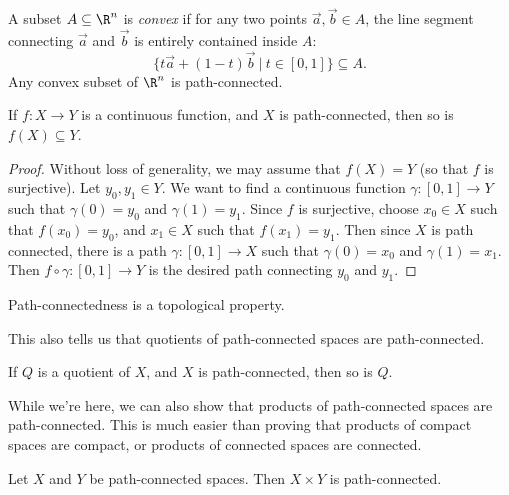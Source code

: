 \documentclass[noname]{notes}
\begin{document}
\begin{example}
\label{convex subsets are path connected}
	A subset $A \subseteq \R^n$ is \emph{convex} if for any two points $\vec a, \vec b \in A$, the line segment connecting $\vec a$ and $\vec b$ is entirely contained inside $A$:
	\[
		\Big\{ t \vec a + (1-t) \vec b \ \Big\vert\ t \in [0,1] \Big\} \subseteq A. 
	\]
	Any convex subset of $\R^n$ is path-connected. 
\end{example}

\begin{proposition}
	If $f \colon X \to Y$ is a continuous function, and $X$ is path-connected, then so is $f(X) \subseteq Y$. 
\end{proposition}

\begin{proof}
	Without loss of generality, we may assume that $f(X) = Y$ (so that $f$ is surjective). Let $y_0, y_1 \in Y$. We want to find a continuous function $\gamma \colon [0,1] \to Y$ such that $\gamma(0) = y_0$ and $\gamma(1) = y_1$. Since $f$ is surjective, choose $x_0 \in X$ such that $f(x_0) = y_0$, and $x_1 \in X$ such that $f(x_1) = y_1$. Then since $X$ is path connected, there is a path $\gamma \colon [0,1] \to X$ such that $\gamma(0) = x_0$ and $\gamma(1) = x_1$. Then $f \circ \gamma \colon [0,1] \to Y$ is the desired path connecting $y_0$ and $y_1$. 
\end{proof}

\begin{corollary}
	Path-connectedness is a topological property. 
\end{corollary}

This also tells us that quotients of path-connected spaces are path-connected. 

\begin{corollary}
	If $Q$ is a quotient of $X$, and $X$ is path-connected, then so is $Q$. 
\end{corollary}

While we're here, we can also show that products of path-connected spaces are path-connected. This is much easier than proving that products of compact spaces are compact, or products of connected spaces are connected.

\begin{proposition}
	Let $X$ and $Y$ be path-connected spaces. Then $X \times Y$ is path-connected. 
\end{proposition}
\end{document}
